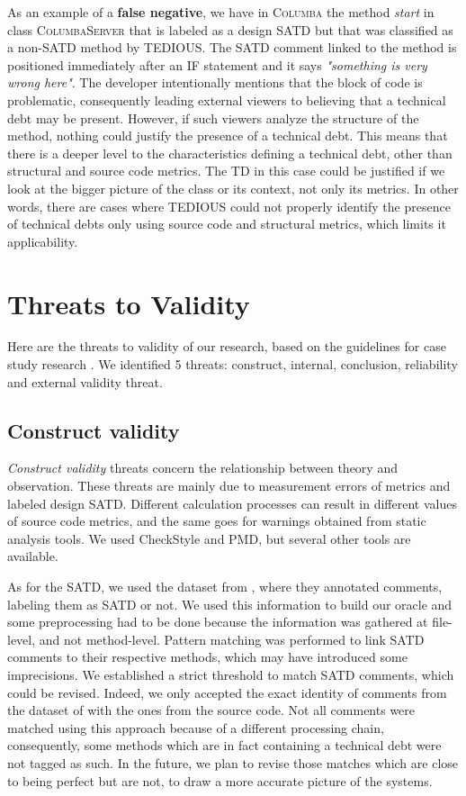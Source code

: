 As an example of a \textbf{false negative}, we have in \textsc{Columba} the method \textit{start} in class \textsc{ColumbaServer} that is labeled as a design SATD but that was classified as a non-SATD method by TEDIOUS. The SATD comment linked to the method is positioned immediately after an \textsc{IF} statement and it says \textit{"something is very wrong here"}. The developer intentionally mentions that the block of code is problematic, consequently leading external viewers to believing that a technical debt may be present. However, if such viewers analyze the structure of the method, nothing could justify the presence of a technical debt. This means that there is a deeper level to the characteristics defining a technical debt, other than structural and source code metrics. The TD in this case could be justified if we look at the bigger picture of the class or its context, not only its metrics. In other words, there are cases where TEDIOUS could not properly identify the presence of technical debts only using source code and structural metrics, which limits it applicability.

\section{Threats to Validity}

Here are the threats to validity of our research, based on the guidelines for case study research \citep{yin2013case}. We identified 5 threats: construct, internal, conclusion, reliability and external validity threat.

\subsection{Construct validity}


\textit{Construct validity} threats concern the relationship between theory and observation. These threats are mainly due to measurement errors of metrics and labeled design SATD. Different calculation processes can result in different values of source code metrics, and the same goes for warnings obtained from static analysis tools. We used CheckStyle and PMD, but several other tools are available. 

As for the SATD, we used the dataset from \citet{maldonado17}, where they annotated comments, labeling them as SATD or not. We used this information to build our oracle and some preprocessing had to be done because the information was gathered at file-level, and not method-level. Pattern matching was performed to link SATD comments to their respective methods, which may have introduced some imprecisions. We established a strict threshold to match SATD comments, which could be revised. Indeed, we only accepted the exact identity of comments from the dataset of \citet{maldonado17} with the ones from the source code. Not all comments were matched using this approach because of a different processing chain, consequently, some methods which are in fact containing a technical debt were not tagged as such. In the future, we plan to revise those matches which are close to being perfect but are not, to draw a more accurate picture of the systems. 

